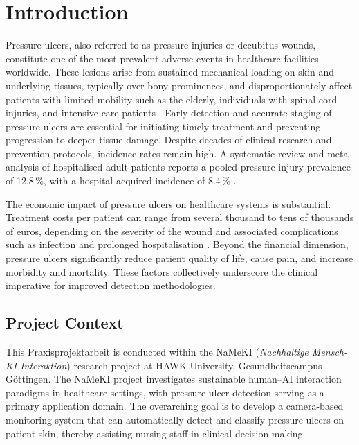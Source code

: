 \documentclass[a4paper,12pt,twoside]{report}
\begin{document}
\clearpage
{}

\chapter{Introduction}
\label{ch:introduction}

Pressure ulcers, also referred to as pressure injuries or decubitus wounds,
constitute one of the most prevalent adverse events in healthcare facilities
worldwide. These lesions arise from sustained mechanical loading on skin and
underlying tissues, typically over bony prominences, and disproportionately
affect patients with limited mobility such as the elderly, individuals with
spinal cord injuries, and intensive care patients \citep{npuap2019staging}. Early
detection and accurate staging of pressure ulcers are essential for initiating
timely treatment and preventing progression to deeper tissue damage. Despite
decades of clinical research and prevention protocols, incidence rates remain
high. A systematic review and meta-analysis of hospitalised adult patients
reports a pooled pressure injury prevalence of 12.8\,\%, with a hospital-acquired
incidence of 8.4\,\% \citep{li2020global}.

The economic impact of pressure ulcers on healthcare systems is substantial.
Treatment costs per patient can range from several thousand to tens of thousands
of euros, depending on the severity of the wound and associated complications
such as infection and prolonged hospitalisation \citep{dealey2012cost}. Beyond
the financial dimension, pressure ulcers significantly reduce patient quality of
life, cause pain, and increase morbidity and mortality. These factors collectively
underscore the clinical imperative for improved detection methodologies.

\section{Project Context}
\label{sec:project-context}

This Praxisprojektarbeit is conducted within the NaMeKI
(\textit{Nachhaltige Mensch-KI-Interaktion}) research project at HAWK
University, Gesundheitscampus G{\"o}ttingen. The NaMeKI project investigates
sustainable human--AI interaction paradigms in healthcare settings, with pressure
ulcer detection serving as a primary application domain. The overarching goal is
to develop a camera-based monitoring system that can automatically detect and
classify pressure ulcers on patient skin, thereby assisting nursing staff in
clinical decision-making.
\end{document}
